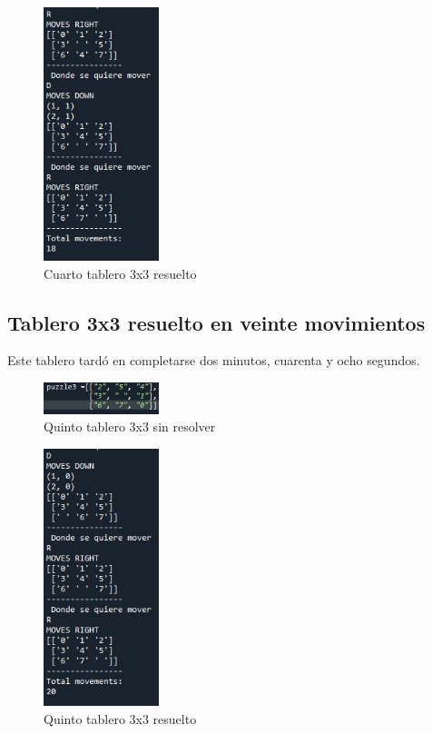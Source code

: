 \documentclass{article}
\begin{document}
        \begin{figure}[H]
        \centering
        \includegraphics[width=0.3\textwidth]{puzzles/puzzle4Solved.PNG}
        \caption{Cuarto tablero 3x3 resuelto}
        \label{fig:ger}
        \end{figure}
        
    \subsection{Tablero 3x3 resuelto en veinte movimientos}
    Este tablero tardó en completarse dos minutos, cuarenta y ocho segundos.
        \begin{figure}[H]
        \centering
        \includegraphics[width=0.3\textwidth]{puzzles/puzzle5.PNG}
        \caption{Quinto tablero 3x3 sin resolver}
        \label{fig:ger}
        \end{figure}
        
        \begin{figure}[H]
        \centering
        \includegraphics[width=0.3\textwidth]{puzzles/puzzle5Solved.PNG}
        \caption{Quinto tablero 3x3 resuelto}
        \label{fig:ger}
        \end{figure}
        
\end{document}
